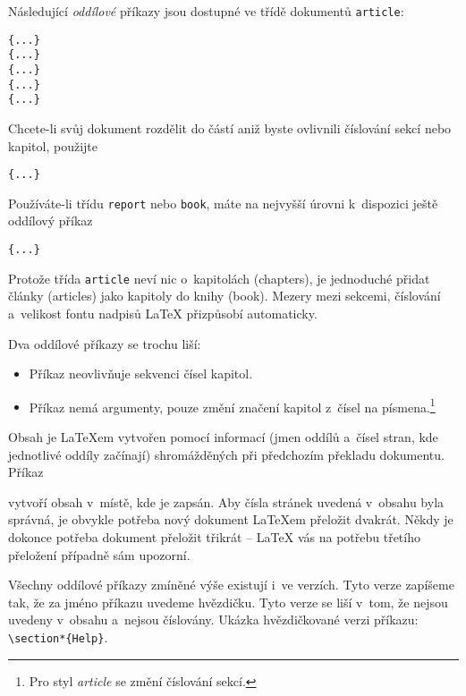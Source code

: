 Následující \emph{oddílové} příkazy jsou dostupné ve třídě dokumentů
\texttt{article}: \nopagebreak

\begin{lscommand}
\verb|{...}|\\
\verb|{...}|\\
\verb|{...}|\\
\verb|{...}|\\
\verb|{...}|
\end{lscommand}

Chcete-li svůj dokument rozdělit do částí aniž byste ovlivnili číslování
sekcí nebo kapitol, použijte
\begin{lscommand}
\verb|{...}|
\end{lscommand}

Používáte-li třídu \texttt{report} nebo \texttt{book}, máte na nejvyšší úrovni
k~dispozici ještě oddílový příkaz
\begin{lscommand}
\verb|{...}|
\end{lscommand}

Protože třída \texttt{article} neví nic o~kapitolách (chapters), je
jednoduché přidat články (articles) jako kapitoly do knihy
(book). Mezery mezi sekcemi, číslování a~velikost fontu nadpisů
\LaTeX{} přizpůsobí automaticky.

Dva oddílové příkazy se trochu liší:
\begin{itemize}
\item Příkaz  neovlivňuje sekvenci čísel kapitol.
\item Příkaz  nemá argumenty, pouze změní značení
  kapitol z~čísel na písmena.\footnote{Pro styl \emph{article}
  se změní číslování sekcí.}
\end{itemize}



Obsah je \LaTeX em vytvořen pomocí informací (jmen oddílů a~čísel stran,
kde jednotlivé oddíly začínají) shromážděných při předchozím překladu
dokumentu. Příkaz
\begin{lscommand} 
\end{lscommand} 
\noindent vytvoří obsah v~místě, kde je zapsán. Aby čísla stránek
uvedená v~obsahu byla správná, je obvykle potřeba nový dokument
\LaTeX em přeložit dvakrát. Někdy je dokonce potřeba
dokument přeložit třikrát -- \LaTeX{} vás na potřebu třetího přeložení
případně sám upozorní.

Všechny oddílové příkazy zmíněné výše existují i~ve 
verzích. Tyto verze zapíšeme tak, že za jméno příkazu uvedeme hvězdičku.
Tyto verze se liší v~tom, že nejsou uvedeny v~obsahu a~nejsou číslovány.
Ukázka hvězdičkované verzi příkazu: \verb|\section*{Help}|.


